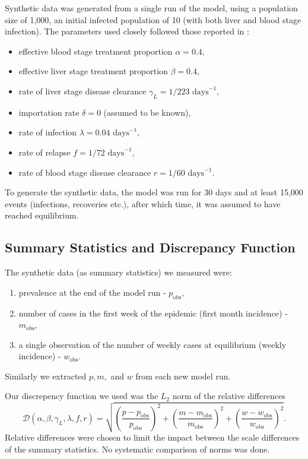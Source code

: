 Synthetic data was generated from a single run of the model, using a population
size of 1,000, an initial infected population of 10 (with both liver and blood
stage infection). The parameters used closely followed those reported in
\cite{champagne_using_2022}: \begin{itemize}
    \item effective blood stage treatment proportion $\alpha = 0.4,$
    \item effective liver stage treatment proportion $\beta = 0.4,$
    \item rate of liver stage disease clearance $\gamma_L = 1 / 223 \text{ days}^{-1},$
    \item importation rate $\delta = 0$ (assumed to be known),
    \item rate of infection $\lambda = 0.04 \text{ days}^{-1},$
    \item rate of relapse $f = 1 / 72 \text{ days}^{-1},$
    \item rate of blood stage disease clearance $r = 1 / 60 \text{ days}^{-1}.$
\end{itemize}
To generate the synthetic data, the model was run for 30 days and at least 15,000 events
(infections, recoveries etc.), after which time, it was assumed to have reached
equilibrium.

\subsection*{Summary Statistics and Discrepancy Function}

The synthetic data (as summary statistics) we measured were:
\begin{enumerate}
    \item prevalence at the end of the model run - $p_\text{obs},$
    \item number of cases in the first week of the epidemic
          (first month incidence) - $m_\text{obs},$
    \item a single observation of the number of weekly cases at equilibrium
          (weekly incidence) - $w_\text{obs}.$
\end{enumerate} Similarly we extracted $p, m,$ and $w$ from each new model run.

Our discrepency function we used was the $L_2$ norm of the relative differences
$$
    \mathcal{D}(\alpha, \beta, \gamma_L, \lambda, f, r) = \sqrt{
        \left(\frac{p - p_\text{obs}}{p_\text{obs}}\right)^2
        + \left(\frac{m - m_\text{obs}}{m_\text{obs}}\right)^2
        + \left(\frac{w - w_\text{obs}}{w_\text{obs}}\right)^2
    }.
$$
Relative differences were chosen to limit the impact between the scale
differences of the summary statistics. No systematic comparison of norms was done.

